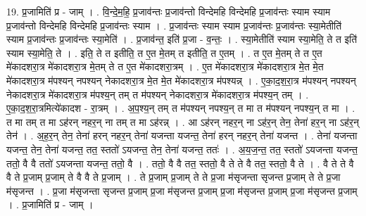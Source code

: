 \documentclass[17pt]{extarticle}
\begin{document}
19. प्र॒जामिति॑ प्र - जाम् । . वि॒न्दे॒म॒हि॒ प्र॒जाव॑न्तः प्र॒जाव॑न्तो विन्देमहि विन्देमहि प्र॒जाव॑न्तः स्याम स्याम प्र॒जाव॑न्तो विन्देमहि विन्देमहि प्र॒जाव॑न्तः स्याम । . प्र॒जाव॑न्तः स्याम स्याम प्र॒जाव॑न्तः प्र॒जाव॑न्तः स्या॒मेतीति॑ स्याम प्र॒जाव॑न्तः प्र॒जाव॑न्तः स्या॒मेति॑ । . प्र॒जाव॑न्त॒ इति॑ प्र॒जा - व॒न्तः॒ । . स्या॒मेतीति॑ स्याम स्या॒मेति॒ ते त इति॑ स्याम स्या॒मेति॒ ते । . इति॒ ते त इतीति॒ त ए॒त मे॒तम् त इतीति॒ त ए॒तम् । . त ए॒त मे॒तम् ते त ए॒त मे॑कादशरा॒त्र मे॑कादशरा॒त्र मे॒तम् ते त ए॒त मे॑कादशरा॒त्रम् । . ए॒त मे॑कादशरा॒त्र मे॑कादशरा॒त्र मे॒त मे॒त मे॑कादशरा॒त्र म॑पश्यन् नपश्यन् नेकादशरा॒त्र मे॒त मे॒त मे॑कादशरा॒त्र म॑पश्यन्न् । . ए॒का॒द॒श॒रा॒त्र म॑पश्यन् नपश्यन् नेकादशरा॒त्र मे॑कादशरा॒त्र म॑पश्य॒न् तम् त म॑पश्यन् नेकादशरा॒त्र मे॑कादशरा॒त्र म॑पश्य॒न् तम् । . ए॒का॒द॒श॒रा॒त्रमित्ये॑कादश - रा॒त्रम् । . अ॒प॒श्य॒न् तम् त म॑पश्यन् नपश्य॒न् त मा त म॑पश्यन् नपश्य॒न् त मा । . त मा तम् त मा ऽह॑रन् नहर॒न् ना तम् त मा ऽह॑रन्न् । . आ ऽह॑रन् नहर॒न् ना ऽह॑र॒न् तेन॒ तेना॑ हर॒न् ना ऽह॑र॒न् तेन॑ । . अ॒ह॒र॒न् तेन॒ तेना॑ हरन् नहर॒न् तेना॑ यजन्ता यजन्त॒ तेना॑ हरन् नहर॒न् तेना॑ यजन्त । . तेना॑ यजन्ता यजन्त॒ तेन॒ तेना॑ यजन्त॒ तत॒ स्ततो॑ ऽयजन्त॒ तेन॒ तेना॑ यजन्त॒ ततः॑ । . अ॒य॒ज॒न्त॒ तत॒ स्ततो॑ ऽयजन्ता यजन्त॒ ततो॒ वै वै ततो॑ ऽयजन्ता यजन्त॒ ततो॒ वै । . ततो॒ वै वै तत॒ स्ततो॒ वै ते ते वै तत॒ स्ततो॒ वै ते । . वै ते ते वै वै ते प्र॒जाम् प्र॒जाम् ते वै वै ते प्र॒जाम् । . ते प्र॒जाम् प्र॒जाम् ते ते प्र॒जा म॑सृजन्ता सृजन्त प्र॒जाम् ते ते प्र॒जा म॑सृजन्त । . प्र॒जा म॑सृजन्ता सृजन्त प्र॒जाम् प्र॒जा म॑सृजन्त प्र॒जाम् प्र॒जा म॑सृजन्त प्र॒जाम् प्र॒जा म॑सृजन्त प्र॒जाम् । . प्र॒जामिति॑ प्र - जाम् । \newline
\end{document}
